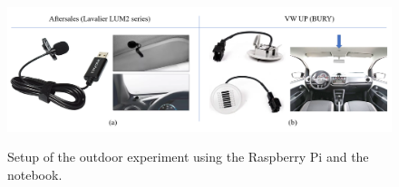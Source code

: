 \begin{figure}[htbp]
    \raggedright
        \caption{Setup of the outdoor experiment using the Raspberry Pi and the notebook.}
        \includegraphics[width=1\textwidth]{resources/images/050-methods/Methods_evaluation_microphone_aftersales_VW_UP.png}
        \label{fig:methods_evaluation_microphone_aftersales_and_VW_UP2}
\end{figure}